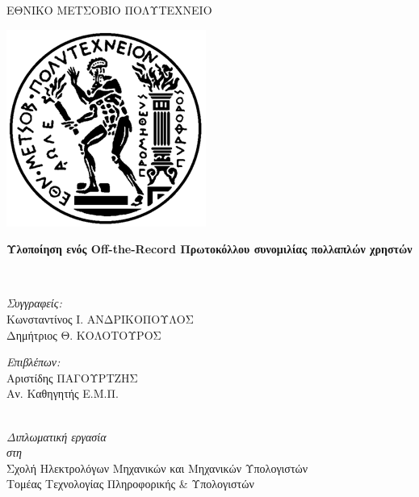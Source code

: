 \documentclass[
11pt, %
english, %
singlespacing, %
parskip, %
headsepline, %
]{MastersDoctoralThesis} %
\begin{document}
\cleardoublepage

\begin{center}

{\scshape\LARGE ΕΘΝΙΚΟ ΜΕΤΣΟΒΙΟ ΠΟΛΥΤΕΧΝΕΙΟ\par} %
{\centering \includegraphics[scale=0.6]{Pyrforos.png}}
\vspace{1.5cm}
\HRule \\[0.4cm] %
{\huge \bfseries Υλοποίηση ενός Off-the-Record Πρωτοκόλλου συνομιλίας πολλαπλών χρηστών\par}\vspace{0.4cm} %
\HRule \\[1.5cm] %

\begin{minipage}[t]{0.49\textwidth}
\begin{flushleft} \large
\emph{Συγγραφείς:}\\
\small
Κωνσταντίνος Ι. ΑΝΔΡΙΚΟΠΟΥΛΟΣ \\
Δημήτριος Θ. ΚΟΛΟΤΟΥΡΟΣ\\%
\end{flushleft}
\end{minipage}
\begin{minipage}[t]{0.49\textwidth}
\begin{flushright} \large
\emph{Επιβλέπων:} \\
Αριστίδης ΠΑΓΟΥΡΤΖΗΣ\\
Αν. Καθηγητής Ε.Μ.Π.%
\end{flushright}
\end{minipage}\\[3cm]

\large \textit{Διπλωματική εργασία}\\[0.3cm] %
\textit{στη}\\[0.4cm]
  Σχολή Ηλεκτρολόγων Μηχανικών και Μηχανικών Υπολογιστών \\ Τομέας Τεχνολογίας Πληροφορικής \& Υπολογιστών\\[2cm] %



\end{center}
\end{document}
